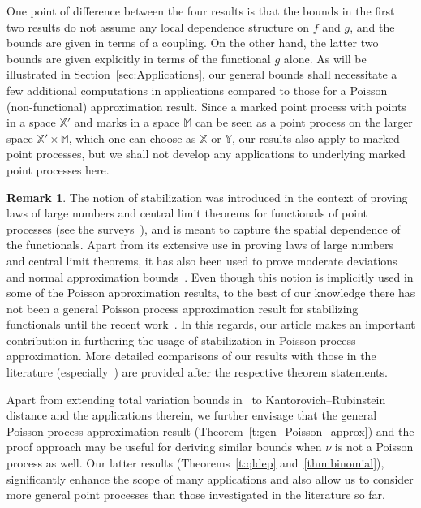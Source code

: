 \documentclass[10pt]{amsart}
\theoremstyle{definition}\newtheorem{defi}[theo]{Definition}\newtheorem{rema}[theo]{Remark}\newtheorem{exam}[theo]{Example}\newtheorem{exem}[theo]{Example}\newtheorem{nota}[theo]{Notation}
\newcommand{\bbM}{\mathbb{M}}
\newcommand*\X{\mathbb{X}}
\newcommand*\Y{\mathbb{Y}}
\begin{document}
One point of difference between the four results is that the bounds in the first two results do not assume any local dependence structure on $f$ and $g$, and the bounds are given in terms of a coupling. On the other hand, the latter two bounds are given explicitly in terms of the functional $g$ alone. As will be illustrated in Section~\ref{sec:Applications}, our general bounds shall necessitate a few additional computations in applications compared to those for a Poisson (non-functional) approximation result. Since a marked point process with points in a space $\X'$ and marks in a space $\bbM$ can be seen as a point process on the larger space $\X'\times \bbM$, which one can choose as $\X$ or $\Y$, our results also apply to marked point processes, but we shall not develop any applications to underlying marked point processes here.

\begin{rema}\label{r:stab}
The notion of stabilization was introduced in the context of proving laws of large numbers and central limit theorems for functionals of point processes (see the surveys~\cite{Schreiber2010,Yukich2013}), and is meant to capture the spatial dependence of the functionals. Apart from its extensive use in proving laws of large numbers and central limit theorems, it has also been used to prove moderate deviations~\cite{Eichelsbacher2015} and normal approximation bounds~\cite{Lachieze2019}. Even though this notion is implicitly used in some of the Poisson approximation results, to the best of our knowledge there has not been a general Poisson process approximation result for stabilizing functionals until the recent work~\cite{Otto2020}. In this regards, our article makes an important contribution in furthering the usage of stabilization in Poisson process approximation. More detailed comparisons of our results with those in the literature (especially~\cite{Barbour1992,decreusefond_functional_2016,Otto2020}) are provided after the respective theorem statements.
\end{rema}

Apart from extending total variation bounds in~\cite{Otto2020} to Kantorovich--Rubinstein distance and the applications therein, we further envisage that the general Poisson process approximation result (Theorem~\ref{t:gen_Poisson_approx}) and the proof approach may be useful for deriving similar bounds when $\nu$ is not a Poisson process as well. Our latter results (Theorems~\ref{t:qldep} and~\ref{thm:binomial}), significantly enhance the scope of many applications and also allow us to consider more general point processes than those investigated in the literature so far.
\end{document}
